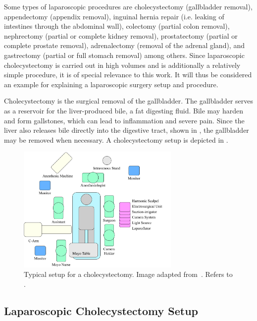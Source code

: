 Some types of laparoscopic procedures are cholecystectomy (gallbladder removal), appendectomy (appendix removal), inguinal hernia repair (i.e. leaking of intestines through the abdominal wall), colectomy (partial colon removal), nephrectomy (partial or complete kidney removal), prostatectomy (partial or complete prostate removal), adrenalectomy (removal of the adrenal gland), and gastrectomy (partial or full stomach removal) among others. Since laparoscopic cholecystectomy is carried out in high volumes and is additionally a relatively simple procedure, it is of special relevance to this work. It will thus be considered an example for explaining a laparoscopic surgery setup and procedure.

Cholecystectomy is the surgical removal of the gallbladder. The gallbladder serves as a reservoir for the liver-produced bile, a fat digesting fluid. Bile may harden and form gallstones, which can lead to inflammation and severe pain. Since the liver also releases bile directly into the digestive tract, shown in , the gallbladder may be removed when necessary. A cholecystectomy setup is depicted in .
\begin{figure}[tb]
    \centering
    \includegraphics[width=0.7\textwidth]{introduction/fig/24_01_26_room_setup.pdf}
    \caption{Typical setup for a cholecystectomy. Image adapted from~\cite{sages2010room}. Refers to .}
    \label{in:fig:room_setup}
\end{figure}
\subsection{Laparoscopic Cholecystectomy Setup}
\label{in:sec:cholecystectomy_setup}

